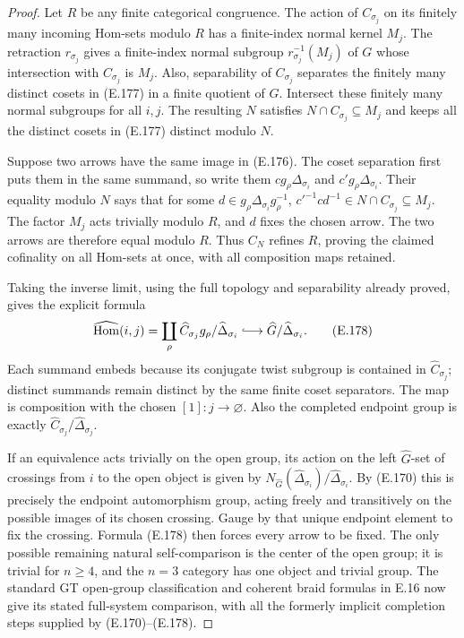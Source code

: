 \begin{proof}
Let $R$ be any finite categorical congruence.  The action of
$C_{\sigma_j}$ on its finitely many incoming Hom-sets modulo
$R$ has a finite-index normal kernel $M_j$.  The retraction
$r_{\sigma_j}$ gives a finite-index normal subgroup
$r_{\sigma_j}^{-1}(M_j)$ of $G$ whose intersection with
$C_{\sigma_j}$ is $M_j$.  Also, separability of
$C_{\sigma_j}$ separates the finitely many distinct cosets
in (E.177) in a finite quotient of $G$.  Intersect these
finitely many normal subgroups for all $i,j$.  The resulting
$N$ satisfies $N\cap C_{\sigma_j}\subseteq M_j$ and keeps
all the distinct cosets in (E.177) distinct modulo $N$.

Suppose two arrows have the same image in (E.176).  The coset
separation first puts them in the same summand, so write them
$c g_\rho\Delta_{\sigma_i}$ and
$c'g_\rho\Delta_{\sigma_i}$.  Their equality modulo $N$
says that for some
$d\in g_\rho\Delta_{\sigma_i}g_\rho^{-1}$,
$c'^{-1}c d^{-1}\in N\cap C_{\sigma_j}\subseteq M_j$.
The factor $M_j$ acts trivially modulo $R$, and $d$ fixes the
chosen arrow.  The two arrows are therefore equal modulo $R$.
Thus $C_N$ refines $R$, proving the claimed cofinality on all
Hom-sets at once, with all composition maps retained.

Taking the inverse limit, using the full topology and
separability already proved, gives the explicit formula
\[
 \widehat{\Hom}(i,j)=
 \coprod_\rho
 \widehat C_{\sigma_j}g_\rho/\widehat\Delta_{\sigma_i}
          \lhook\joinrel\longrightarrow
                 \widehat G/\widehat\Delta_{\sigma_i}.         \tag{E.178}
\]
Each summand embeds because its conjugate twist subgroup is
contained in $\widehat C_{\sigma_j}$; distinct summands remain
distinct by the same finite coset separators.  The map is
composition with the chosen $[1]:j\to\varnothing$.  Also the
completed endpoint group is exactly
$\widehat C_{\sigma_j}/\widehat\Delta_{\sigma_j}$.

If an equivalence acts trivially on the open group, its action
on the left $\widehat G$-set of crossings from $i$ to the open
object is given by
$N_{\widehat G}(\widehat\Delta_{\sigma_i})/
\widehat\Delta_{\sigma_i}$.  By (E.170) this is precisely the
endpoint automorphism group, acting freely and transitively
on the possible images of its chosen crossing.  Gauge by that
unique endpoint element to fix the crossing.  Formula (E.178)
then forces every arrow to be fixed.  The only possible
remaining natural self-comparison is the center of the open
group; it is trivial for $n\geq4$, and the $n=3$ category has
one object and trivial group.  The standard GT open-group
classification and coherent braid formulas in E.16 now give
its stated full-system comparison, with all the formerly
implicit completion steps supplied by (E.170)--(E.178).
\end{proof}
